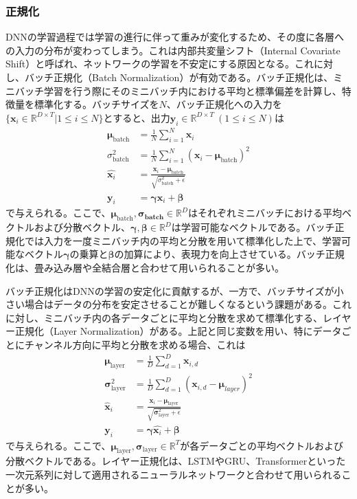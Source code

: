 \documentclass[12pt]{jarticle}
\numberwithin{equation}{section}    %
\numberwithin{figure}{section}      %
\numberwithin{table}{section}      %
\begin{document}
\subsubsection{正規化}
DNNの学習過程では学習の進行に伴って重みが変化するため、その度に各層への入力の分布が変わってしまう。これは内部共変量シフト（Internal Covariate Shift）と呼ばれ、ネットワークの学習を不安定にする原因となる。これに対し、バッチ正規化（Batch Normalization）\cite{ioffe2015batch}が有効である。バッチ正規化は、ミニバッチ学習を行う際にそのミニバッチ内における平均と標準偏差を計算し、特徴量を標準化する。バッチサイズを$N$、バッチ正規化への入力を$\{ \bm{x}_{i} \in \mathbb{R}^{D \times T} | 1 \le i \le N \}$とすると、出力$\bm{y}_{i} \in \mathbb{R}^{D \times T} ~ (1 \le i \le N)$は
\begin{align}
    \bm{\mu}_{\text{batch}}   & = \frac{1}{N} \sum_{i = 1}^{N} \bm{x}_{i}                                                  \\
    \sigma_{\text{batch}}^{2} & = \frac{1}{N} \sum_{i = 1}^{N} (\bm{x}_{i} - \bm{\mu}_{\text{batch}})^{2}                  \\
    \hat{\bm{x}_{i}}          & = \frac{\bm{x}_{i} - \bm{\mu}_{\text{batch}}}{\sqrt{\sigma_{\text{batch}}^{2} + \epsilon}} \\
    \bm{y}_{i}                & = \bm{\gamma} \hat{\bm{x}_{i}} + \bm{\beta}
\end{align}
で与えられる。ここで、$\bm{\mu}_{\text{batch}}, \bm{\sigma_{\text{batch}}} \in \mathbb{R}^{D}$はそれぞれミニバッチにおける平均ベクトルおよび分散ベクトル、$\bm{\gamma}, \bm{\beta} \in \mathbb{R}^{D}$は学習可能なベクトルである。バッチ正規化では入力を一度ミニバッチ内の平均と分散を用いて標準化した上で、学習可能なベクトル$\bm{\gamma}$の乗算と$\bm{\beta}$の加算により、表現力を向上させている。バッチ正規化は、畳み込み層や全結合層と合わせて用いられることが多い。

バッチ正規化はDNNの学習の安定化に貢献するが、一方で、バッチサイズが小さい場合はデータの分布を安定させることが難しくなるという課題がある。これに対し、ミニバッチ内の各データごとに平均と分散を求めて標準化する、レイヤー正規化（Layer Normalization）\cite{ba2016layer}がある。上記と同じ変数を用い、特にデータごとにチャンネル方向に平均と分散を求める場合、これは
\begin{align}
    \bm{\mu}_{\text{layer}}        & = \frac{1}{D} \sum_{d = 1}^{D} \bm{x}_{i, d}                                                     \\
    \bm{\sigma}_{\text{layer}}^{2} & = \frac{1}{D} \sum_{d = 1}^{D} (\bm{x}_{i, d} - \bm{\mu}_{layer})^{2}                            \\
    \hat{\bm{x}}_{i}               & = \frac{\bm{x}_{i} - \bm{\mu}_{\text{layer}}}{\sqrt{\bm{\sigma}_{\text{layer}}^{2}  + \epsilon}} \\
    \bm{y}_{i}                     & = \bm{\gamma} \hat{\bm{x}_{i}} + \bm{\beta}
\end{align}
で与えられる。ここで、$\bm{\mu}_{\text{layer}}, \bm{\sigma}_{\text{layer}} \in \mathbb{R}^{T}$が各データごとの平均ベクトルおよび分散ベクトルである。レイヤー正規化は、LSTMやGRU、Transformerといった一次元系列に対して適用されるニューラルネットワークと合わせて用いられることが多い。
\end{document}
